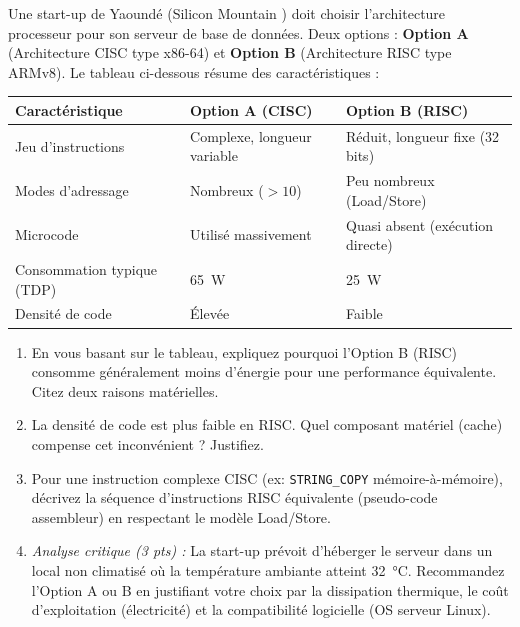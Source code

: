 \documentclass[11pt]{article}
\begin{document}
\begin{exercice}
Une start-up de Yaoundé (\og Silicon Mountain \fg) doit choisir l'architecture processeur pour son serveur de base de données. Deux options : \textbf{Option A} (Architecture CISC type x86-64) et \textbf{Option B} (Architecture RISC type ARMv8). Le tableau ci-dessous résume des caractéristiques :

\begin{tabularx}{\linewidth}{>{\raggedright\arraybackslash}X>{\centering\arraybackslash}X>{\centering\arraybackslash}X}
\toprule
\textbf{Caractéristique} & \textbf{Option A (CISC)} & \textbf{Option B (RISC)} \\
\midrule
Jeu d'instructions & Complexe, longueur variable & Réduit, longueur fixe (32 bits) \\
Modes d'adressage & Nombreux ($>10$) & Peu nombreux (Load/Store) \\
Microcode & Utilisé massivement & Quasi absent (exécution directe) \\
Consommation typique (TDP) & \SI{65}{\watt} & \SI{25}{\watt} \\
Densité de code & Élevée & Faible \\
\bottomrule
\end{tabularx}

\begin{enumerate}
    \item En vous basant sur le tableau, expliquez pourquoi l'Option B (RISC) consomme généralement moins d'énergie pour une performance équivalente. Citez deux raisons matérielles.
    \item La \og densité de code \fg est plus faible en RISC. Quel composant matériel (cache) compense cet inconvénient ? Justifiez.
    \item Pour une instruction complexe CISC (ex: \texttt{STRING\_COPY} mémoire-à-mémoire), décrivez la séquence d'instructions RISC équivalente (pseudo-code assembleur) en respectant le modèle Load/Store.
    \item \textit{Analyse critique (3 pts) :} La start-up prévoit d'héberger le serveur dans un local non climatisé où la température ambiante atteint \SI{32}{\celsius}. Recommandez l'Option A ou B en justifiant votre choix par la dissipation thermique, le coût d'exploitation (électricité) et la compatibilité logicielle (OS serveur Linux).
\end{enumerate}
\end{exercice}
\end{document}
